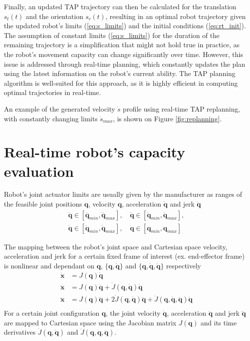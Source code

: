 Finally, an updated TAP trajectory can then be calculated for the translation $s_t(t)$ and the orientation $s_r(t)$, resulting in an optimal robot trajectory given the updated robot's limits (\ref{eq:s_limits}) and the initial conditions (\ref{eq:rt_init}). 
The assumption of constant limits (\ref{eq:s_limits}) for the duration of the remaining trajectory is a simplification that might not hold true in practice, as the robot's movement capacity can change significantly over time. However, this issue is addressed through real-time planning, which constantly updates the plan using the latest information on the robot's current ability. The TAP planning algorithm is well-suited for this approach, as it is highly efficient in computing optimal trajectories in real-time. 

An example of the generated velocity $\dot{s}$ profile using real-time TAP replanning, with constantly changing limits $\dot{s}_{max}$, is shown on Figure \ref{fig:replanning}. 

\section{Real-time robot's capacity evaluation}
\label{ch:capacity}

Robot's joint actuator limits are usually given by the manufacturer as ranges of the feasible joint positions $\bm{q}$, velocity $\bm{q}$, acceleration $\dot{\bm{q}}$ and jerk $\ddot{\bm{q}}$
\begin{equation}
\begin{split}
\dddot{\bm{q}} \in [ \dddot{\bm{q}}_{min}, \dddot{\bm{q}}_{max}] ,&~\ddot{\bm{q}} \in [\ddot{\bm{q}}_{min},  \ddot{\bm{q}}_{max}],\\ 
\dot{\bm{q}} \in [\dot{\bm{q}}_{min},  \dot{\bm{q}}_{max}],&~{\bm{q}} \in [{\bm{q}}_{min},  {\bm{q}}_{max}]
\end{split}
\label{eq:kin_limits}
\end{equation}

The mapping between the robot's joint space and Cartesian space velocity, acceleration and jerk for a certain fixed frame of interest (ex. end-effector frame) is nonlinear and dependant on $\bm{q}$, $\{\bm{q},\dot{\bm{q}}\}$ and $\{\bm{q},\dot{\bm{q}},\ddot{\bm{q}}\}$ respectively 
\begin{equation}
\begin{split}
\dot{\bm{x}}&= J(\bm{q})\dot{\bm{q}}\\
\ddot{\bm{x}}&= J(\bm{q})\ddot{\bm{q}} + \dot{J}(\bm{q},\dot{\bm{q}})\dot{\bm{q}}\\
\dddot{\bm{x}}&= J(\bm{q})\dddot{\bm{q}} + 2\dot{J}(\bm{q},\dot{\bm{q}})\ddot{\bm{q}} + \ddot{J}(\bm{q},\dot{\bm{q}},\ddot{\bm{q}})\dot{\bm{q}}\\
 \end{split} \label{eq:js_to_cs_vaj}
\end{equation}
For a certain joint configuration $\bm{q}$, the joint velocity $\dot{\bm{q}}$, acceleration $\ddot{\bm{q}}$ and jerk $\dddot{\bm{q}}$ are mapped to Cartesian space using the Jacobian matrix $J(\bm{q})$ and its time derivatives $\dot{J}(\bm{q},\dot{\bm{q}})$ and  $\ddot{J}(\bm{q},\dot{\bm{q}},\ddot{\bm{q}})$. 

